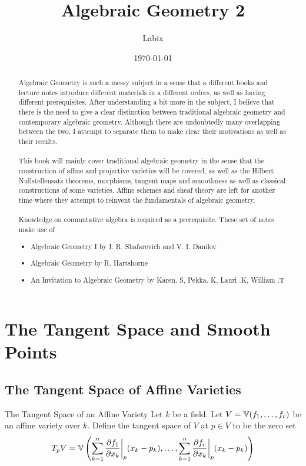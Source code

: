 \documentclass[a4paper]{article}
\title{Algebraic Geometry 2}
\author{Labix}
\date{\today}
\begin{document}
\maketitle
\begin{abstract}
Algebraic Geometry is such a messy subject in a sense that a different books and lecture notes introduce different materials in a different orders, as well as having different prerequisites. After understanding a bit more in the subject, I believe that there is the need to give a clear distinction between traditional algebraic geometry and contemporary algebraic geometry. Although there are undoubtedly many overlapping between the two, I attempt to separate them to make clear their motivations as well as their results. \\~\\

This book will mainly cover traditional algebraic geometry in the sense that the construction of affine and projective varieties will be covered, as well as the Hilbert Nullstellensatz theorems, morphisms, tangent maps and smoothness as well as classical constructions of some varieties. Affine schemes and sheaf theory are left for another time where they attempt to reinvent the fundamentals of algebraic geometry. \\~\\

Knowledge on commutative algebra is required as a prerequisite. These set of notes make use of
\begin{itemize}
\item Algebraic Geometry I by I. R. Shafarevich and V. I. Danilov
\item Algebraic Geometry by R. Hartshorne
\item An Invitation to Algebraic Geometry by Karen. S, Pekka. K, Lauri .K, William .T
\end{itemize}
\end{abstract}
\pagebreak
\tableofcontents

\pagebreak
\section{The Tangent Space and Smooth Points}
\subsection{The Tangent Space of Affine Varieties}
\begin{defn}{The Tangent Space of an Affine Variety}{} Let $k$ be a field. Let $V=\mathbb{V}(f_1,\dots,f_r)$ be an affine variety over $k$. Define the tangent space of $V$ at $p\in V$ to be the zero set $$T_pV=\mathbb{V}\left(\sum_{k=1}^n\frac{\partial f_1}{\partial x_k}\bigg{|}_p(x_k-p_k),\dots,\sum_{k=1}^n\frac{\partial f_r}{\partial x_k}\bigg{|}_p(x_k-p_k)\right)$$
\end{defn}
\end{document}

